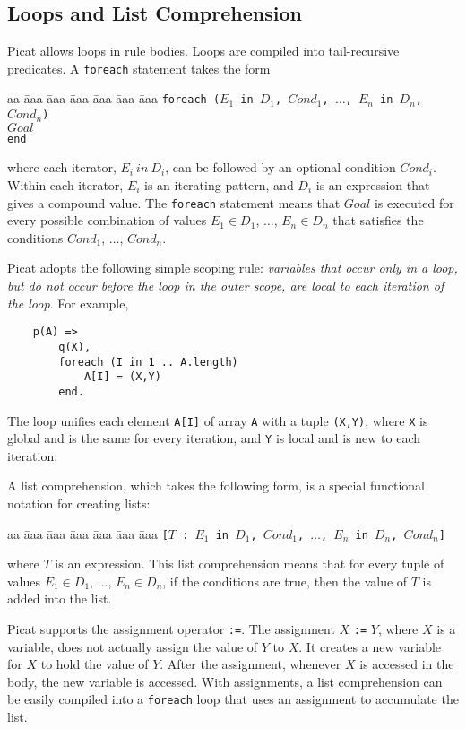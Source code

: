 \documentclass{new_tlp}
\begin{document}
\subsection{Loops and List Comprehension}
Picat allows loops in rule bodies.  Loops are compiled into tail-recursive predicates. A \texttt{foreach} statement takes the form
\begin{tabbing}
aa \= aaa \= aaa \= aaa \= aaa \= aaa \= aaa \kill
\> \texttt{foreach ($E_1$ in $D_1$, $Cond_1$, $\ldots$, $E_n$ in $D_n$, $Cond_n$)}  \\
\> \> $Goal$ \\
\>  \texttt{end} 
\end{tabbing}
where each iterator, $E_i\ in\ D_i$, can be followed by an optional condition $Cond_i$.  Within each iterator, $E_i$ is an iterating pattern, and $D_i$ is an expression that gives a compound value. The \texttt{foreach} statement means that $Goal$ is executed for every possible combination of values $E_1 \in D_1$, $\ldots$, $E_n \in D_n$ that satisfies the conditions \texttt{$Cond_1$}, $\ldots$, \texttt{$Cond_n$}. 

Picat adopts the following simple scoping rule: {\it variables that occur only in a loop, but do not occur before the loop in the outer scope, are local to each iteration of the loop}. For example,
\begin{verbatim}
    p(A) =>                                    
        q(X),
        foreach (I in 1 .. A.length)            
            A[I] = (X,Y)                      
        end.                                   
\end{verbatim}
The loop unifies each element {\tt A[I]} of array {\tt A} with a tuple {\tt (X,Y)}, where {\tt X} is global and is the same for every iteration, and {\tt Y} is local and is new to each iteration.

A list comprehension, which takes the following form, is a special functional notation for creating lists:
\begin{tabbing}
aa \= aaa \= aaa \= aaa \= aaa \= aaa \= aaa \kill
\> \> \texttt{[$T$ : $E_1$ \texttt{in} $D_1$, $Cond_1$, $\ldots$, $E_n$ in $D_n$, $Cond_n$]} 
\end{tabbing}
where $T$ is an expression. This list comprehension means that for every tuple of values $E_1 \in D_1$, $\ldots$, $E_n \in D_n$, if the conditions are true, then the value of $T$ is added into the list.

Picat supports the assignment operator {\tt :=}. The assignment $X$ {\tt :=} $Y$, where $X$ is a variable, does not actually assign the value of $Y$ to $X$. It creates a new variable for $X$ to hold the value of $Y$. After the assignment, whenever $X$ is accessed in the body, the new variable is accessed. With assignments, a list comprehension can be easily compiled into a {\tt foreach} loop that uses an assignment to accumulate the list.
\end{document}
